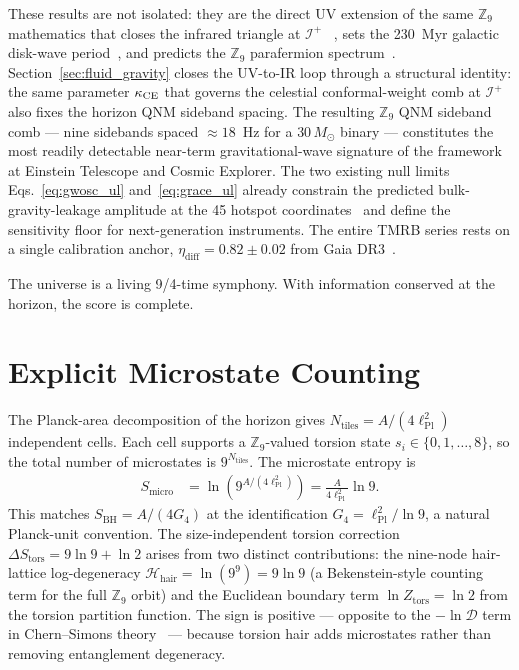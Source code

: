 \documentclass[11pt,a4paper]{article}
\begin{document}
These results are not isolated: they are the direct UV extension of the same
$\mathbb{Z}_9$ mathematics that closes the infrared triangle at $\mathscr{I}^+$
~\cite{BresslerCH2026,BresslerMellin2026}, sets the 230~Myr galactic disk-wave
period~\cite{BresslerGP2026}, and predicts the $\mathbb{Z}_9$ parafermion
spectrum~\cite{BresslerCH2026}.  Section~\ref{sec:fluid_gravity} closes the
UV-to-IR loop through a structural identity: the same parameter $\kappa_{\rm CE}$
that governs the celestial conformal-weight comb at $\mathscr{I}^+$ also fixes
the horizon QNM sideband spacing.  The resulting $\mathbb{Z}_9$ QNM sideband
comb --- nine sidebands spaced $\approx 18$~Hz for a $30\,M_\odot$ binary ---
constitutes the most readily detectable near-term gravitational-wave signature
of the framework at Einstein Telescope and Cosmic Explorer.  The two existing
null limits Eqs.~\eqref{eq:gwosc_ul} and~\eqref{eq:grace_ul} already constrain the
predicted bulk-gravity-leakage amplitude at the 45 hotspot
coordinates~\cite{BresslerBGL2026} and define the sensitivity floor for
next-generation instruments.  The entire TMRB series rests on a single
calibration anchor, $\eta_{\mathrm{diff}} = 0.82\pm0.02$ from Gaia
DR3~\cite{GaiaDR3}.

The universe is a living 9/4-time symphony.  With information conserved at the
horizon, the score is complete.

\appendix

\section{Explicit Microstate Counting}
\label{app:microstate}

The Planck-area decomposition of the horizon gives
$N_{\mathrm{tiles}} = A/(4\ell_{\mathrm{Pl}}^2)$ independent cells.  Each cell
supports a $\mathbb{Z}_9$-valued torsion state $s_i \in \{0,1,\ldots,8\}$, so the
total number of microstates is $9^{N_{\mathrm{tiles}}}$.  The microstate entropy is
\begin{align}
  S_{\mathrm{micro}} &= \ln\!\left(9^{A/(4\ell_{\mathrm{Pl}}^2)}\right)
    = \frac{A}{4\ell_{\mathrm{Pl}}^2}\ln 9. \label{eq:S_micro}
\end{align}
This matches $S_{\mathrm{BH}} = A/(4G_4)$ at the identification
$G_4 = \ell_{\mathrm{Pl}}^2/\ln 9$, a natural Planck-unit convention.  The
size-independent torsion correction $\Delta S_{\mathrm{tors}} = 9\ln 9 + \ln 2$
arises from two distinct contributions: the nine-node hair-lattice log-degeneracy
$\mathcal{H}_{\mathrm{hair}} = \ln(9^9) = 9\ln 9$ (a Bekenstein-style counting
term for the full $\mathbb{Z}_9$ orbit) and the Euclidean boundary term
$\ln Z_{\mathrm{tors}} = \ln 2$ from the torsion partition function.  The
sign is positive — opposite to the $-\ln\mathcal{D}$ term in
Chern--Simons theory~\cite{LevinWen2006} — because torsion hair adds microstates
rather than removing entanglement degeneracy.
\end{document}
